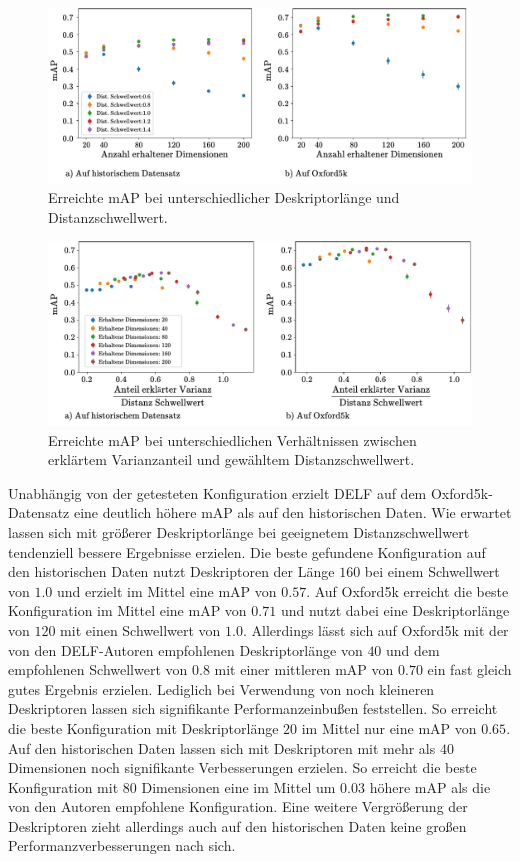 \begin{figure}[h]
\includegraphics[scale=0.73]{mAp_num_dim}
\caption{Erreichte mAP bei unterschiedlicher Deskriptorlänge und Distanzschwellwert.}
\label{mAP_num_dim}
\end{figure}

\begin{figure}[h]
\includegraphics[scale=0.73]{mAp_var_dist_ratio}
\caption{Erreichte mAP bei unterschiedlichen Verhältnissen zwischen erklärtem Varianzanteil und gewähltem Distanzschwellwert.}
\label{mAP_var_dist_ratio}
\end{figure}
Unabhängig von der getesteten Konfiguration erzielt DELF auf dem Oxford5k-Datensatz eine deutlich höhere mAP als auf den historischen Daten. Wie erwartet lassen sich mit größerer Deskriptorlänge bei geeignetem Distanzschwellwert tendenziell bessere Ergebnisse erzielen. Die beste gefundene Konfiguration auf den historischen Daten nutzt Deskriptoren der Länge $160$ bei einem Schwellwert von $1.0$ und erzielt im Mittel eine mAP von $0.57$. Auf Oxford5k erreicht die beste Konfiguration im Mittel eine mAP von $0.71$ und nutzt dabei eine Deskriptorlänge von $120$ mit einen Schwellwert von $1.0$. Allerdings lässt sich auf Oxford5k mit der von den DELF-Autoren empfohlenen Deskriptorlänge von $40$ und dem empfohlenen Schwellwert von $0.8$ mit einer mittleren mAP von $0.70$ ein fast gleich gutes Ergebnis erzielen. Lediglich bei Verwendung von noch kleineren Deskriptoren lassen sich signifikante Performanzeinbußen feststellen. So erreicht die beste Konfiguration mit Deskriptorlänge $20$ im Mittel nur eine mAP von $0.65$. Auf den historischen Daten lassen sich mit Deskriptoren mit mehr als $40$ Dimensionen noch signifikante Verbesserungen erzielen. So erreicht die beste Konfiguration mit $80$ Dimensionen eine im Mittel um $0.03$ höhere mAP als die von den Autoren empfohlene Konfiguration. Eine weitere Vergrößerung der Deskriptoren zieht allerdings auch auf den historischen Daten keine großen Performanzverbesserungen nach sich.
